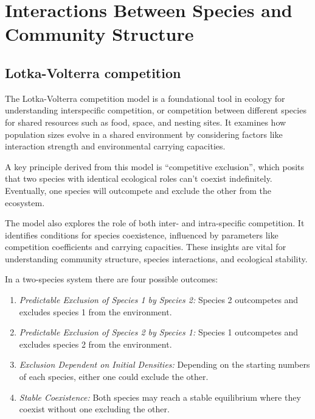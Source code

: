 \documentclass[
  a4paper]{book}
\providecommand{\tightlist}{%
  \setlength{\itemsep}{0pt}\setlength{\parskip}{0pt}}
\begin{document}
\hypertarget{part-interactions-between-species-and-community-structure}{%
\part{Interactions Between Species and Community Structure}\label{part-interactions-between-species-and-community-structure}}

\hypertarget{lotka-volterra-competition}{%
\chapter{Lotka-Volterra competition}\label{lotka-volterra-competition}}

The Lotka-Volterra competition model is a foundational tool in ecology for understanding interspecific competition, or competition between different species for shared resources such as food, space, and nesting sites. It examines how population sizes evolve in a shared environment by considering factors like interaction strength and environmental carrying capacities.

A key principle derived from this model is ``competitive exclusion'', which posits that two species with identical ecological roles can't coexist indefinitely. Eventually, one species will outcompete and exclude the other from the ecosystem.

The model also explores the role of both inter- and intra-specific competition. It identifies conditions for species coexistence, influenced by parameters like competition coefficients and carrying capacities. These insights are vital for understanding community structure, species interactions, and ecological stability.

In a two-species system there are four possible outcomes:

\begin{enumerate}
\def\labelenumi{\arabic{enumi}.}
\tightlist
\item
  \emph{Predictable Exclusion of Species 1 by Species 2:} Species 2 outcompetes and excludes species 1 from the environment.
\item
  \emph{Predictable Exclusion of Species 2 by Species 1:} Species 1 outcompetes and excludes species 2 from the environment.
\item
  \emph{Exclusion Dependent on Initial Densities:} Depending on the starting numbers of each species, either one could exclude the other.
\item
  \emph{Stable Coexistence:} Both species may reach a stable equilibrium where they coexist without one excluding the other.
\end{enumerate}
\end{document}
